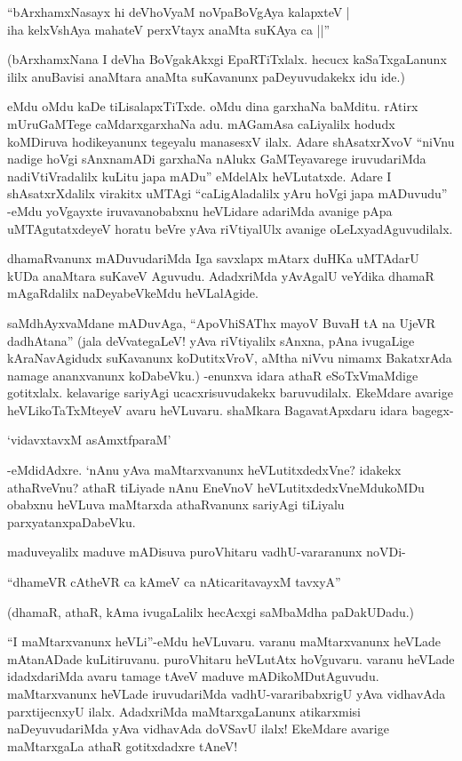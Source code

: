 \begin{shloka}
``bArxhamxNasayx hi deVhoV\s yaM noVpaBoVgAya kalapxteV |\\
iha kelxVshAya mahateV perxVtayx anaMta suKAya ca ||''
\end{shloka}

(bArxhamxNana I deVha BoVgakAkxgi EpaRTiTxlalx. hecucx kaSaTxgaLanunx ililx anuBavisi anaMtara anaMta suKavanunx paDeyuvudakekx idu ide.)

eMdu oMdu kaDe tiLisalapxTiTxde. oMdu dina garxhaNa baMditu. rAtirx mUruGaMTege caMdarxgarxhaNa adu. mAGamAsa caLiyalilx hodudx koMDiruva hodikeyanunx tegeyalu manasesxV ilalx. Adare shAsatxrXvoV ``niVnu nadige hoVgi sAnxnamADi garxhaNa nAlukx GaMTeyavarege iruvudariMda nadiVtiVradalilx kuLitu japa mADu'' eMdelAlx heVLutatxde. Adare I shAsatxrXdalilx virakitx uMTAgi ``caLigAladalilx yAru hoVgi japa mADuvudu'' -eMdu yoVgayxte iruvavanobabxnu heVLidare adariMda avanige pApa uMTAgutatxdeyeV horatu beVre yAva riVtiyalUlx avanige oLeLxyadAguvudilalx.

dhamaRvanunx mADuvudariMda Iga savxlapx mAtarx duHKa uMTAdarU kUDa anaMtara suKaveV Aguvudu. AdadxriMda yAvAgalU veYdika dhamaR mAgaRdalilx naDeyabeVkeMdu heVLalAgide.

saMdhAyxvaMdane mADuvAga, ``ApoVhiSAThx mayoV BuvaH tA na UjeVR dadhAtana'' (jala deVvategaLeV! yAva riVtiyalilx sAnxna, pAna ivugaLige kAraNavAgidudx suKavanunx koDutitxVroV, aMtha niVvu nimamx BakatxrAda namage ananxvanunx koDabeVku.) -enunxva idara athaR eSoTxVmaMdige gotitxlalx. kelavarige sariyAgi ucacxrisuvudakekx baruvudilalx. EkeMdare avarige heVLikoTaTxMteyeV avaru heVLuvaru. shaMkara BagavatApxdaru idara bagegx-

\begin{shloka}
`vidavxtavxM asAmxtfparaM'
\end{shloka}

-eMdidAdxre. `nAnu yAva maMtarxvanunx heVLutitxdedxVne? idakekx athaRveVnu? athaR tiLiyade nAnu EneVnoV heVLutitxdedxVneMdukoMDu obabxnu heVLuva maMtarxda athaRvanunx sariyAgi tiLiyalu parxyatanxpaDabeVku.

maduveyalilx maduve mADisuva puroVhitaru vadhU-vararanunx noVDi-

\begin{shloka}
``dhameVR cAtheVR ca kAmeV ca nAticaritavayxM tavxyA''
\end{shloka}

(dhamaR, athaR, kAma ivugaLalilx hecAcxgi saMbaMdha paDakUDadu.)

``I maMtarxvanunx heVLi''-eMdu heVLuvaru. varanu maMtarxvanunx heVLade mAtanADade kuLitiruvanu. puroVhitaru heVLutAtx hoVguvaru. varanu heVLade idadxdariMda avaru tamage tAveV maduve mADikoMDutAguvudu. maMtarxvanunx heVLade iruvudariMda vadhU-vararibabxrigU yAva vidhavAda parxtijecnxyU ilalx. AdadxriMda maMtarxgaLanunx atikarxmisi naDeyuvudariMda yAva vidhavAda doVSavU ilalx! EkeMdare avarige maMtarxgaLa athaR gotitxdadxre tAneV!

